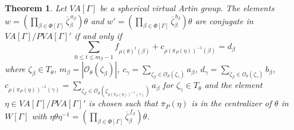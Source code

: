 \documentclass[12pt]{amsart}
\newtheorem{theorem}[equation]{Theorem}
\numberwithin{equation}{section}
\begin{document}
\begin{theorem}\label{crystallographic conjugacy}
Let $VA[\Gamma]$ be a spherical virtual Artin group. The elements $w=(\prod_{\beta \in \Phi[\Gamma]} \overline{\zeta}_{\beta}^{\,a_\beta})\theta$ and $w'=(\prod_{\beta \in \Phi[\Gamma]} \overline{\zeta}_{\beta}^{ \,b_\beta})\theta$ are conjugate in $VA[\Gamma]/PVA[\Gamma]'$ if and only if 
$$\sum_{0\le t \le m_\beta-1}f_{\rho(\theta)^{t}(\beta)}+c_{\rho(\overline{\pi}_P(\eta))^{-1}(\beta)}=d_\beta$$
where $\zeta_\beta \in T_\theta$, $m_\beta=|\mathcal{O}_{\theta}(\zeta_{\beta})|$, $c_{\gamma}=\sum_{\zeta_\beta\in\mathcal{O}_{\theta}(\zeta_{\gamma})}{a_\beta}$, $d_{\gamma}=\sum_{\zeta_\beta\in\mathcal{O}_{\theta}(\zeta_{\gamma})}{b_\beta}$, $c_{\rho(\overline{\pi}_P(\eta))^{-1}(\gamma)}=\sum_{\zeta_\beta\in\mathcal{O}_{\theta}(\zeta_{\rho(\overline{\pi}_P(\eta))^{-1}(\gamma)})}{a_\beta}$ for $\zeta_\gamma \in T_\theta$ and the element  $\eta\in VA[\Gamma]/PVA[\Gamma]'$ is chosen such that $\overline{\pi}_P(\eta)$ is in the centralizer of $\theta$ in $W[\Gamma]$ with $\eta\theta\eta^{-1}= (\prod_{\beta\in \Phi[\Gamma]} \overline{\zeta}_{\beta}^{\,f_{\beta}})\theta$.
\end{theorem}
\end{document}
